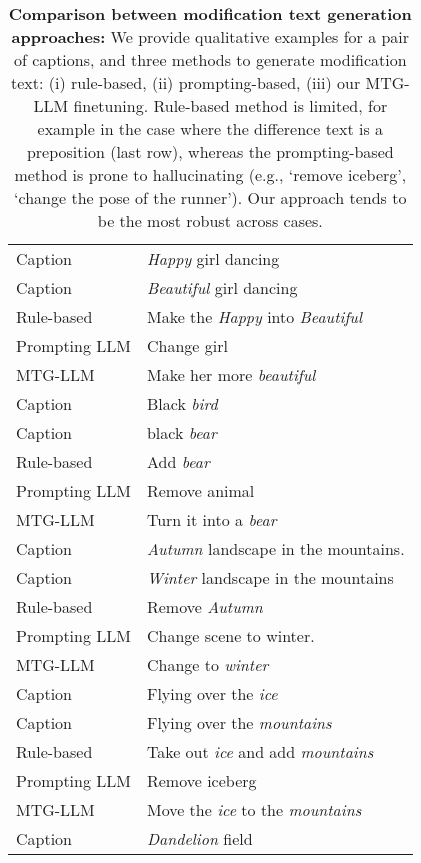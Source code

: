 \begin{table} \caption{\textbf{Comparison between modification text generation approaches:}
    We provide qualitative examples for a pair of captions, and three methods to generate
    modification text: (i) rule-based, (ii) prompting-based, (iii) our MTG-LLM finetuning.
    Rule-based method is limited, for example in the case where the difference text is a preposition (last row),
    whereas the prompting-based method is prone to hallucinating (e.g., `remove iceberg', `change the pose of the runner').
    Our approach tends to be the most robust across cases.}
    \label{tab:rule-based-comparision}
    \begin{tabular}{ll}
    \toprule
    Caption & \textit{Happy} girl dancing \\
    Caption & \textit{Beautiful} girl dancing \\
    Rule-based & Make the \textit{Happy} into \textit{Beautiful} \\
    Prompting LLM & Change girl \\
    MTG-LLM & Make her more \textit{beautiful} \\
    \midrule
    Caption & Black \textit{bird} \\
    Caption &  black \textit{bear} \\
    Rule-based & Add \textit{bear} \\
    Prompting LLM & Remove animal \\
    MTG-LLM & Turn it into a \textit{bear} \\
    \midrule
    Caption & \textit{Autumn} landscape in the mountains. \\
    Caption & \textit{Winter} landscape in the mountains \\
    Rule-based & Remove \textit{Autumn} \\
    Prompting LLM & Change scene to winter. \\
    MTG-LLM & Change to \textit{winter} \\
    \midrule
    Caption & Flying over the \textit{ice} \\
    Caption & Flying over the \textit{mountains} \\
    Rule-based & Take out \textit{ice} and add \textit{mountains} \\
    Prompting LLM & Remove iceberg \\
    MTG-LLM & Move the \textit{ice} to the \textit{mountains} \\
    \midrule
    Caption & \textit{Dandelion} field \\

\end{tabular}
\end{table}
